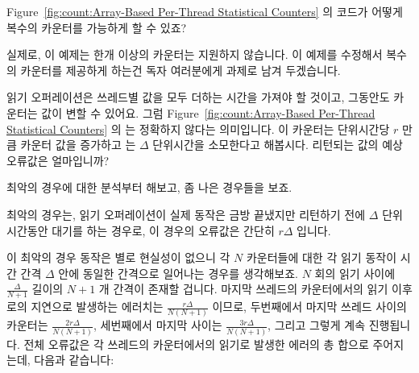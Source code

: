 \begin{enumerate}
\QuickQ{}
	Figure~\ref{fig:count:Array-Based Per-Thread Statistical Counters}
	의 코드가 어떻게 복수의 카운터를 가능하게 할 수 있죠?

\QuickA{}
	실제로, 이 예제는 한개 이상의 카운터는 지원하지 않습니다.
	이 예제를 수정해서 복수의 카운터를 제공하게 하는건 독자 여러분에게
	과제로 남겨 두겠습니다.

\QuickQ{}
	읽기 오퍼레이션은 쓰레드별 값을 모두 더하는 시간을 가져야 할 것이고,
	그동안도 카운터는 값이 변할 수 있어요.
	그럼 Figure~\ref{fig:count:Array-Based Per-Thread Statistical Counters}
	의   는 정확하지 않다는 의미입니다.
	이 카운터는 단위시간당 $r$ 만큼 카운터 값을 증가하고 
	는 $\Delta$ 단위시간을 소모한다고 해봅시다.
	리턴되는 값의 예상 오류값은 얼마입니까?

\QuickA{}
	최악의 경우에 대한 분석부터 해보고, 좀 나은 경우들을 보죠.

	최악의 경우는, 읽기 오퍼레이션이 실제 동작은 금방 끝냈지만 리턴하기
	전에 $\Delta$ 단위시간동안 대기를 하는 경우로, 이 경우의 오류값은
	간단히 $r \Delta$ 입니다.

	이 최악의 경우 동작은 별로 현실성이 없으니 각 $N$ 카운터들에 대한 각
	읽기 동작이 시간 간격 $\Delta$ 안에 동일한 간격으로 일어나는 경우를
	생각해보죠.
	$N$ 회의 읽기 사이에 $\frac{\Delta}{N+1}$ 길이의 $N+1$ 개 간격이 존재할
	겁니다.
	마지막 쓰레드의 카운터에서의 읽기 이후로의 지연으로 발생하는 에러치는
	$\frac{r \Delta}{N \left( N + 1 \right)}$ 이므로, 두번째에서 마지막
	쓰레드 사이의 카운터는
	$\frac{2 r \Delta}{N \left( N + 1 \right)}$,
	세번째에서 마지막 사이는
	$\frac{3 r \Delta}{N \left( N + 1 \right)}$,
	그리고 그렇게 계속 진행됩니다.
	전체 오류값은 각 쓰레드의 카운터에서의 읽기로 발생한 에러의 총 합으로
	주어지는데, 다음과 같습니다:


\end{enumerate}
